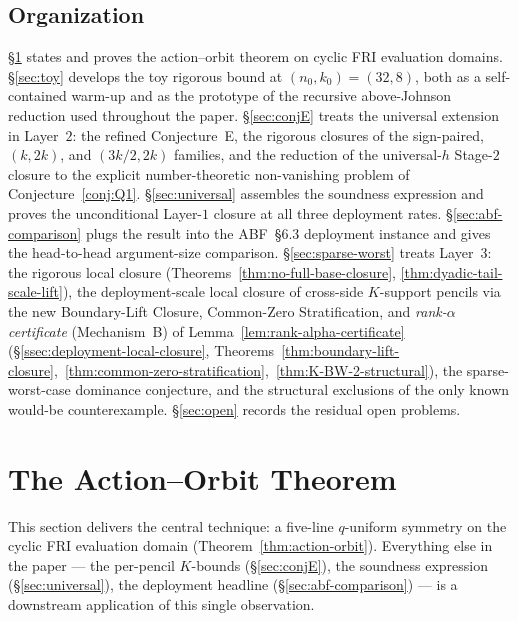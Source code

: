 \documentclass[11pt]{article}
\theoremstyle{definition}
\theoremstyle{remark}
\begin{document}
\subsection{Organization}

\S\ref{sec:action-orbit} states and proves the action--orbit theorem
on cyclic FRI evaluation domains. \S\ref{sec:toy} develops the
toy rigorous bound at $(n_0, k_0) = (32, 8)$, both as a
self-contained warm-up and as the prototype of the recursive
above-Johnson reduction used throughout the paper.
\S\ref{sec:conjE} treats the universal extension in Layer~$2$: the
refined Conjecture~E, the rigorous closures of the sign-paired,
$(k, 2k)$, and $(3k/2, 2k)$ families, and the reduction of the
universal-$h$ Stage-$2$ closure to the explicit number-theoretic
non-vanishing problem of Conjecture~\ref{conj:Q1}.
\S\ref{sec:universal} assembles the soundness expression and
proves the unconditional Layer-$1$ closure at all three deployment
rates. \S\ref{sec:abf-comparison} plugs the result into the
ABF~\S 6.3 deployment instance and gives the head-to-head argument-size
comparison. \S\ref{sec:sparse-worst} treats Layer~$3$: the rigorous
local closure (Theorems~\ref{thm:no-full-base-closure},
\ref{thm:dyadic-tail-scale-lift}), the deployment-scale local closure of
cross-side $K$-support pencils via the new Boundary-Lift Closure,
Common-Zero Stratification, and \emph{rank-$\alpha$ certificate}
(Mechanism~B) of Lemma~\ref{lem:rank-alpha-certificate}
(\S\ref{ssec:deployment-local-closure},
Theorems~\ref{thm:boundary-lift-closure},~\ref{thm:common-zero-stratification},~\ref{thm:K-BW-2-structural}),
the sparse-worst-case dominance
conjecture, and the structural exclusions of the only known would-be
counterexample. \S\ref{sec:open} records the residual open problems.

\section{The Action--Orbit Theorem}
\label{sec:action-orbit}

\noindent This section delivers the central technique: a five-line
$q$-uniform symmetry on the cyclic FRI evaluation domain
(Theorem~\ref{thm:action-orbit}). Everything else in the paper ---
the per-pencil $K$-bounds (\S\ref{sec:conjE}), the soundness
expression (\S\ref{sec:universal}), the deployment headline
(\S\ref{sec:abf-comparison}) --- is a downstream application of
this single observation.
\end{document}
